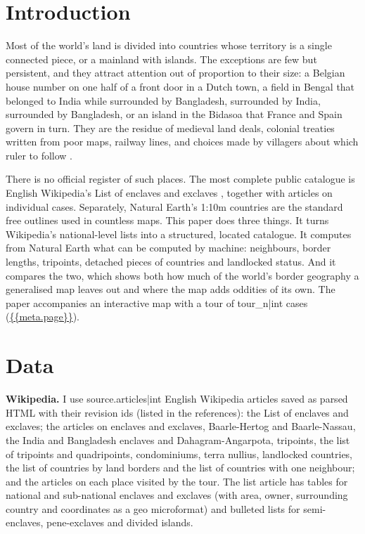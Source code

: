 \documentclass[11pt,a4paper]{article}
\begin{document}
\section{Introduction}
Most of the world's land is divided into countries whose territory is a single connected piece, or a mainland with islands. The exceptions are few but persistent, and they attract attention out of proportion to their size: a Belgian house number on one half of a front door in a Dutch town, a field in Bengal that belonged to India while surrounded by Bangladesh, surrounded by India, surrounded by Bangladesh, or an island in the Bidasoa that France and Spain govern in turn. They are the residue of medieval land deals, colonial treaties written from poor maps, railway lines, and choices made by villagers about which ruler to follow \citep{wlist,wenclave}.

There is no official register of such places. The most complete public catalogue is English Wikipedia's List of enclaves and exclaves \citep{wlist}, together with articles on individual cases. Separately, Natural Earth's 1:10m countries \citep{naturalearth} are the standard free outlines used in countless maps. This paper does three things. It turns Wikipedia's national-level lists into a structured, located catalogue. It computes from Natural Earth what can be computed by machine: neighbours, border lengths, tripoints, detached pieces of countries and landlocked status. And it compares the two, which shows both how much of the world's border geography a generalised map leaves out and where the map adds oddities of its own. The paper accompanies an interactive map with a tour of {{tour_n|int}} cases (\url{{{meta.page}}}).

\section{Data}
\textbf{Wikipedia.} I use {{source.articles|int}} English Wikipedia articles saved as parsed HTML with their revision ids (listed in the references): the List of enclaves and exclaves; the articles on enclaves and exclaves, Baarle-Hertog and Baarle-Nassau, the India and Bangladesh enclaves and Dahagram-Angarpota, tripoints, the list of tripoints and quadripoints, condominiums, terra nullius, landlocked countries, the list of countries by land borders and the list of countries with one neighbour; and the articles on each place visited by the tour. The list article has tables for national and sub-national enclaves and exclaves (with area, owner, surrounding country and coordinates as a geo microformat) and bulleted lists for semi-enclaves, pene-exclaves and divided islands.
\end{document}
